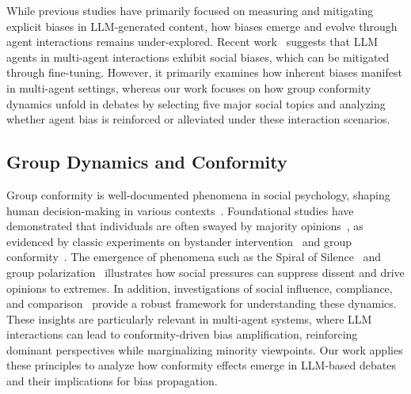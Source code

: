 \documentclass[11pt]{article}
\begin{document}
While previous studies have primarily focused on measuring and mitigating explicit biases in LLM-generated content, how biases emerge and evolve through agent interactions remains under-explored. Recent work~\citep{taubenfeld2024systematic} suggests that LLM agents in multi-agent interactions exhibit social biases, which can be mitigated through fine-tuning. However, it primarily examines how inherent biases manifest in multi-agent settings, whereas our work focuses on how group conformity dynamics unfold in debates by selecting five major social topics and analyzing whether agent bias is reinforced or alleviated under these interaction scenarios.



\subsection{Group Dynamics and Conformity}
Group conformity is well-documented phenomena in social psychology, shaping human decision-making in various contexts~\citep{asch1955opinions, milgram1963behavioral, kelman1958compliance}. Foundational studies have demonstrated that individuals are often swayed by majority opinions~\citep{moscovici1969influence}, as evidenced by classic experiments on bystander intervention~\citep{darley1968bystander} and group conformity~\citep{gerard1968conformity}. The emergence of phenomena such as the Spiral of Silence~\citep{noelle-neumann1974spiral} and group polarization~\citep{myers1976group, isenberg1986group, turner1998groupthink} illustrates how social pressures can suppress dissent and drive opinions to extremes. In addition, investigations of social influence, compliance, and comparison~\citep{cialdini2004social, bond1996culture, latane1981psychology, ross1977false} provide a robust framework for understanding these dynamics. These insights are particularly relevant in multi-agent systems, where LLM interactions can lead to conformity-driven bias amplification, reinforcing dominant perspectives while marginalizing minority viewpoints. Our work applies these principles to analyze how conformity effects emerge in LLM-based debates and their implications for bias propagation.
\end{document}
